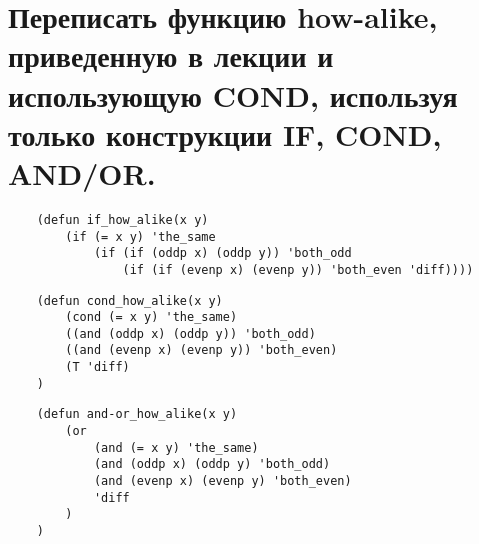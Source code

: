 \documentclass[12pt]{report}
\begin{document}
\section{Переписать функцию how-alike, приведенную в лекции и использующую COND, используя только конструкции IF, COND, AND/OR.}

\begin{lstlisting}
	(defun if_how_alike(x y)
		(if (= x y) 'the_same 
			(if (if (oddp x) (oddp y)) 'both_odd
				(if (if (evenp x) (evenp y)) 'both_even 'diff))))
\end{lstlisting}
\begin{lstlisting}
	(defun cond_how_alike(x y)
		(cond (= x y) 'the_same)
		((and (oddp x) (oddp y)) 'both_odd)
		((and (evenp x) (evenp y)) 'both_even)
		(T 'diff)
	)
\end{lstlisting}
\begin{lstlisting}
	(defun and-or_how_alike(x y)
		(or
			(and (= x y) 'the_same)
			(and (oddp x) (oddp y) 'both_odd)
			(and (evenp x) (evenp y) 'both_even)
			'diff
		)
	)
\end{lstlisting}
\end{document}
